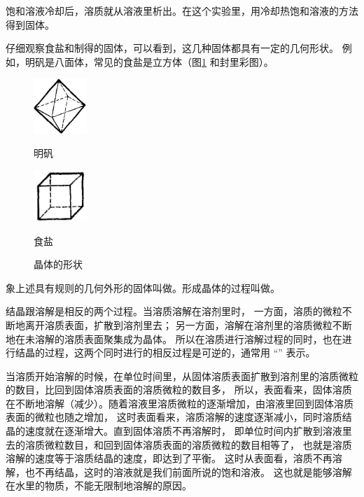 饱和溶液冷却后，溶质就从溶液里析出。在这个实验里，用冷却热饱和溶液的方法得到固体。

仔细观察食盐和制得的固体，可以看到，这几种固体都具有一定的几何形状。
例如，明矾是八面体，常见的食盐是立方体（图\ref{fig:4-7} 和封里彩图）。

\begin{figure}[htbp]
    \centering
    \begin{minipage}[b]{7cm}
        \centering
        \includegraphics[width=2cm]{../pic/czhx1-ch4-7-1}
    \caption*{明矾}
    \end{minipage}
    \qquad
    \begin{minipage}[b]{7cm}
        \centering
        \includegraphics[width=2cm]{../pic/czhx1-ch4-7-2}
        \caption*{食盐}
    \end{minipage}
    \caption{晶体的形状}\label{fig:4-7}
\end{figure}


象上述具有规则的几何外形的固体叫做。形成晶体的过程叫做。

结晶跟溶解是相反的两个过程。当溶质溶解在溶剂里时，
一方面，溶质的微粒不断地离开溶质表面，扩散到溶剂里去；
另一方面，溶解在溶剂里的溶质微粒不断地在未溶解的溶质表面聚集成为晶体。
所以在溶质进行溶解过程的同时，也在进行结晶的过程，这两个同时进行的相反过程是可逆的，通常用 “\ce{<=>}” 表示。
\begin{fangchengshi}
\end{fangchengshi}

当溶质开始溶解的时候，在单位时间里，从固体溶质表面扩散到溶剂里的溶质微粒的数目，比回到固体溶质表面的溶质微粒的数目多，
所以，表面看来，固体溶质在不断地溶解（减少）。随着溶液里溶质微粒的逐渐增加，由溶液里回到固体溶质表面的微粒也随之增加，
这时表面看来，溶质溶解的速度逐渐减小，同时溶质结晶的速度就在逐渐增大。直到固体溶质不再溶解时，
即单位时间内扩散到溶液里去的溶质微粒数目，和回到固体溶质表面的溶质微粒的数目相等了，
也就是溶质溶解的速度等于溶质结晶的速度，即达到了平衡。
这时从表面看，溶质不再溶解，也不再结晶，这时的溶液就是我们前面所说的饱和溶液。
这也就是能够溶解在水里的物质，不能无限制地溶解的原因。


